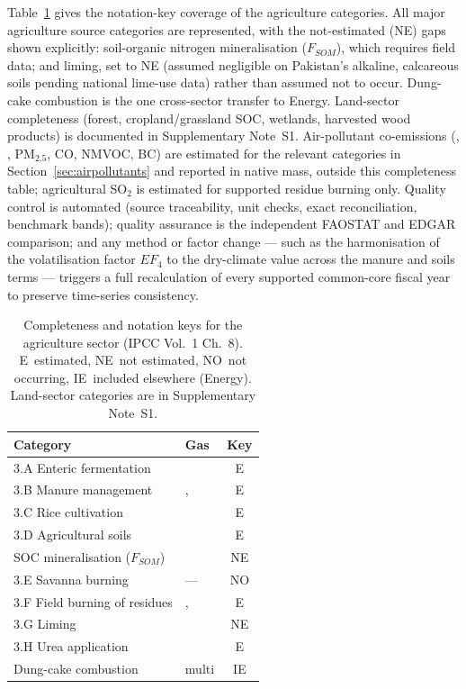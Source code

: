 Table~\ref{tab:completeness} gives the notation-key coverage of the agriculture
categories. All major agriculture source categories are represented, with the
not-estimated (NE) gaps shown explicitly: soil-organic nitrogen mineralisation
($F_{SOM}$), which requires field data; and liming, set to NE (assumed negligible on
Pakistan's alkaline, calcareous soils pending national lime-use data) rather than
assumed not to occur. Dung-cake combustion is the one cross-sector transfer to
Energy. Land-sector completeness (forest, cropland/grassland SOC, wetlands,
harvested wood products) is documented in Supplementary Note~S1. Air-pollutant
co-emissions (\NHthree{}, \NOx{}, PM$_{2.5}$, CO, NMVOC, BC) are estimated for the
relevant categories in Section~\ref{sec:airpollutants} and reported in native mass,
outside this \COe{} completeness table; agricultural SO$_2$ is estimated for
supported residue burning only. Quality control is automated (source
traceability, unit checks, exact reconciliation, benchmark bands); quality
assurance is the independent FAOSTAT and EDGAR comparison; and any method or factor
change --- such as the harmonisation of the volatilisation factor $EF_4$ to the
dry-climate value across the manure and soils terms --- triggers a full
recalculation of every supported common-core fiscal year to preserve time-series consistency.

\begin{table}[!htbp]
\centering
\footnotesize
\begin{tabular}{@{}llc@{}}
\toprule
\textbf{Category} & \textbf{Gas} & \textbf{Key} \\
\midrule
3.A Enteric fermentation        & \CHfour{}          & E \\
3.B Manure management           & \CHfour{}, \NtwoO{} & E \\
3.C Rice cultivation            & \CHfour{}          & E \\
3.D Agricultural soils          & \NtwoO{}           & E \\
\quad SOC mineralisation ($F_{SOM}$) & \NtwoO{}      & NE \\
3.E Savanna burning             & ---                & NO \\
3.F Field burning of residues   & \CHfour{}, \NtwoO{} & E \\
3.G Liming                      & \COtwo{}           & NE \\
3.H Urea application            & \COtwo{}           & E \\
Dung-cake combustion            & multi              & IE \\
\bottomrule
\end{tabular}
\caption{Completeness and notation keys for the agriculture sector (IPCC Vol.~1
Ch.~8). E~estimated, NE~not estimated, NO~not occurring, IE~included elsewhere
(Energy). Land-sector categories are in Supplementary Note~S1.}
\label{tab:completeness}
\end{table}

